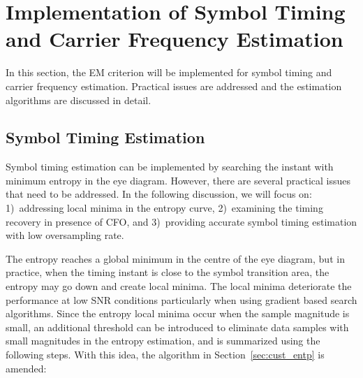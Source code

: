 \documentclass[journal,comsoc]{IEEEtran}
\begin{document}
\section{Implementation of Symbol Timing and Carrier Frequency Estimation}
\label{sec:imple}
In this section, the EM criterion will be implemented for symbol timing and carrier frequency estimation.
Practical issues are addressed and the estimation algorithms are discussed in detail. 

\subsection{Symbol Timing Estimation} 
\label{sec:timing}
Symbol timing estimation can be implemented by searching the instant with minimum entropy in the eye diagram.
However, there are several practical issues that need to be addressed.
In the following discussion, we will focus on: 
1)~addressing local minima in the entropy curve,  
2)~examining the timing recovery in presence of CFO, and 
3)~providing accurate symbol timing estimation with low oversampling rate.

The entropy reaches a global minimum in the centre of the eye diagram, but in practice, when the timing instant is close to the symbol transition area, the entropy may go down and create local minima. 
The local minima deteriorate the performance at low SNR conditions particularly when using gradient based search algorithms.
Since the entropy local minima occur when the sample magnitude is small, an additional threshold can be introduced to eliminate data samples with small magnitudes in the entropy estimation, and is summarized using the following steps.
With this idea, the algorithm in Section~\ref{sec:cust_entp} is amended:
\end{document}
